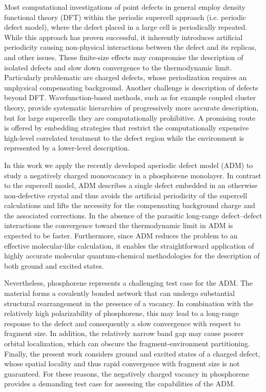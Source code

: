 \documentclass[aip,jcp,reprint]{revtex4-2}
\begin{document}
Most computational investigations of point defects in general employ density functional theory (DFT) within the periodic supercell approach (i.e. periodic defect model), where the defect placed in a large cell is periodically repeated.\cite{Freysoldt2014Review} While this approach has proven successful, it inherently introduces artificial periodicity causing non-physical interactions between the defect and its replicas, and other issues. These finite-size effects may compromise the description of isolated defects and slow down convergence to the thermodynamic limit. Particularly problematic are charged defects, whose periodization requires an unphysical compensating background.\cite{Freysoldt2009ChargeCorrection,Lany2008FiniteSizeErrors} Another challenge is description of defects beyond DFT. Wavefunction-based methods, such as for example coupled cluster theory, provide systematic hierarchies of progressively more accurate description, but for large supercells they are computationally prohibitive. A promising route is offered by embedding strategies that restrict the computationally expensive high-level correlated treatment to the defect region while the environment is represented by a lower-level description.\cite{Sun2016EmbeddingReview,..}


In this work we apply the recently developed aperiodic defect model (ADM)\cite{...} to study a negatively charged monovacancy in a phosphorene monolayer. In contrast to the supercell model, ADM describes a single defect embedded in an otherwise non-defective crystal and thus avoids the artificial periodicity of the supercell calculations and lifts the necessity for the compensating background charge and the associated corrections.  In the absence of the parasitic long-range defect–defect interactions the convergence toward the thermodynamic limit in ADM is expected to be faster. Furthermore, since ADM reduces the problem to an effective molecular-like calculation, it enables the straightforward application of highly accurate molecular quantum-chemical methodologies for the description of both ground and excited states.

Nevertheless, phosphorene represents a challenging test case for the ADM. The material forms a covalently bonded network that can undergo substantial structural rearrangement in the presence of a vacancy. In combination with the relatively high polarizability of phosphorene, this may lead to a long-range response to the defect and consequently a slow convergence with respect to fragment size. In addition, the relatively narrow band gap may cause poorer orbital localization, which can obscure the fragment-environment partitioning. Finally, the present work considers ground and excited states of a charged defect, whose spatial locality and thus rapid convergence with fragment size is not guaranteed. For these reasons, the negatively charged vacancy in phosphorene provides a demanding test case for assessing the capabilities of the ADM.
\end{document}
